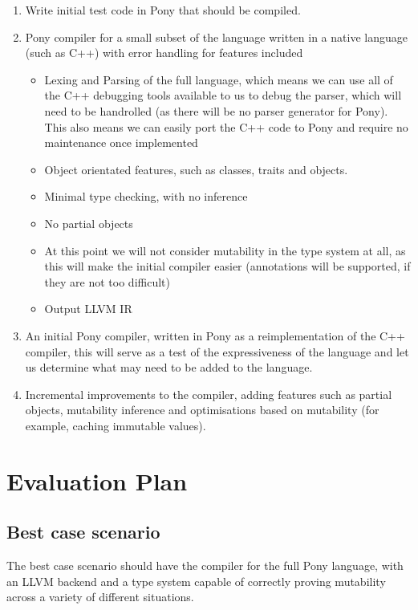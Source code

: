 \documentclass{article}
\begin{document}
\begin{enumerate}
	\item Write initial test code in Pony that should be compiled.
	\item Pony compiler for a small subset of the language written in a native language
	(such as C++) with error handling for features included
		\begin{itemize}
			\item Lexing and Parsing of the full language, which means we can use all of the
			C++ debugging tools available to us to debug the parser, which will need to be 
			handrolled (as there will be no parser generator for Pony). This also means we
			can easily port the C++ code to Pony and require no maintenance once implemented
			\item Object orientated features, such as classes, traits and objects.
			\item Minimal type checking, with no inference
			\item No partial objects
			\item At this point we will not consider mutability in the type system at all, as this will
			make the initial compiler easier (annotations will be supported, if they are not too difficult)
			\item Output LLVM IR
		\end{itemize}
	\item An initial Pony compiler, written in Pony as a reimplementation of the C++ compiler, this will
	serve as a test of the expressiveness of the language and let us determine what may need
	to be added to the language.
	\item Incremental improvements to the compiler, adding features such as partial objects, mutability
	inference and optimisations based on mutability (for example, caching immutable values).
\end{enumerate}

\section{Evaluation Plan}

\subsection{Best case scenario}

The best case scenario should have the compiler for the full Pony language, with
an LLVM backend and a type system capable of correctly proving mutability across
a variety of different situations.
\end{document}
